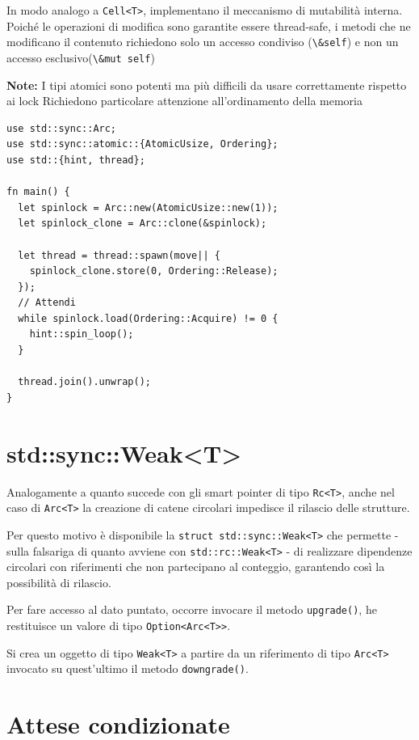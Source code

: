 In modo analogo a \verb|Cell<T>|, implementano il meccanismo di
mutabilità interna. Poiché le operazioni di modifica sono garantite essere
thread-safe, i metodi che ne modificano il contenuto richiedono solo un accesso
condiviso (\verb|\&self|) e non un accesso esclusivo(\verb|\&mut self|)



\begin{tcolorbox}
  \textbf{Note:} I tipi atomici sono potenti ma più difficili da usare
  correttamente rispetto ai lock Richiedono particolare attenzione
  all'ordinamento della memoria
\end{tcolorbox}

\begin{verbatim}
use std::sync::Arc;
use std::sync::atomic::{AtomicUsize, Ordering};
use std::{hint, thread};

fn main() {
  let spinlock = Arc::new(AtomicUsize::new(1));
  let spinlock_clone = Arc::clone(&spinlock);
  
  let thread = thread::spawn(move|| {
    spinlock_clone.store(0, Ordering::Release);
  });
  // Attendi
  while spinlock.load(Ordering::Acquire) != 0 {
    hint::spin_loop();
  }

  thread.join().unwrap();
}
\end{verbatim}

\section{std::sync::Weak<T>}
Analogamente a quanto succede con gli smart pointer di tipo \verb|Rc<T>|,
anche nel caso di \verb|Arc<T>| la creazione di catene circolari impedisce il rilascio delle strutture.

Per questo motivo è disponibile la \verb|struct std::sync::Weak<T>| che permette - sulla falsariga di
quanto avviene con \verb|std::rc::Weak<T>| - di realizzare dipendenze circolari con riferimenti che non
partecipano al conteggio, garantendo così la possibilità di rilascio.


Per fare accesso al dato puntato, occorre invocare il metodo \verb|upgrade()|,
he restituisce un valore di tipo \verb|Option<Arc<T>>|.

Si crea un oggetto di tipo \verb|Weak<T>| a partire da un riferimento di tipo
\verb|Arc<T>| invocato su quest'ultimo il metodo \verb|downgrade()|.


\section{Attese condizionate}

